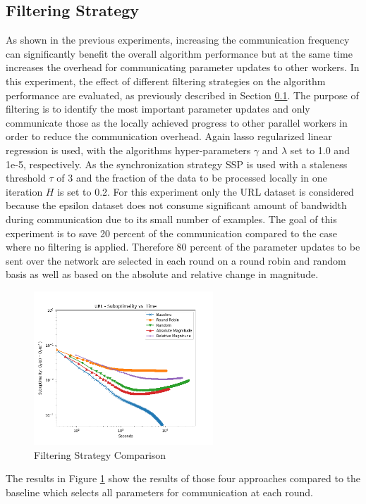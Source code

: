 \subsection{Filtering Strategy}
\label{ss:filtering_strategy}
As shown in the previous experiments, increasing the communication frequency can significantly benefit the overall algorithm performance but at the same time increases the overhead for communicating parameter updates to other workers.
In this experiment, the effect of different filtering strategies on the algorithm performance are evaluated, as previously described in Section \ref{ss:filtering_strategy}.
The purpose of filtering is to identify the most important parameter updates and only communicate those as the locally achieved progress to other parallel workers in order to reduce the communication overhead.
Again lasso regularized linear regression is used, with the algorithms hyper-parameters $\gamma$ and $\lambda$ set to 1.0 and 1e-5, respectively.
As the synchronization strategy SSP is used with a staleness threshold $\tau$ of 3 and the fraction of the data to be processed locally in one iteration $H$ is set to 0.2.
For this experiment only the URL dataset is considered because the epsilon dataset does not consume significant amount of bandwidth during communication due to its small number of examples.
The goal of this experiment is to save 20 percent of the communication compared to the case where no filtering is applied.
Therefore 80 percent of the parameter updates to be sent over the network are selected in each round on a round robin and random basis as well as based on the absolute and relative change in magnitude.
\begin{figure}[ht]
\centering
\includegraphics[width=0.6\textwidth]{img/filter_strat_cmp.png}
\caption{Filtering Strategy Comparison}
\label{fig:filt_strat_cmp}
\end{figure}
The results in Figure \ref{fig:filt_strat_cmp} show the results of those four approaches compared to the baseline which selects all parameters for communication at each round.
